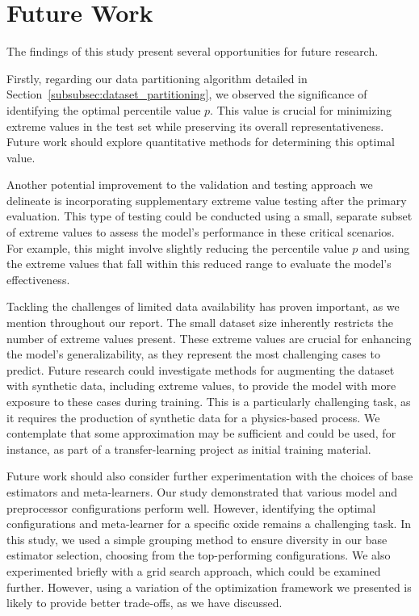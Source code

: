 \section{Future Work}\label{sec:future_work}
The findings of this study present several opportunities for future research.

Firstly, regarding our data partitioning algorithm detailed in Section~\ref{subsubsec:dataset_partitioning}, we observed the significance of identifying the optimal percentile value $p$.
This value is crucial for minimizing extreme values in the test set while preserving its overall representativeness.
Future work should explore quantitative methods for determining this optimal value.

Another potential improvement to the validation and testing approach we delineate is incorporating supplementary extreme value testing after the primary evaluation.
This type of testing could be conducted using a small, separate subset of extreme values to assess the model's performance in these critical scenarios.
For example, this might involve slightly reducing the percentile value $p$ and using the extreme values that fall within this reduced range to evaluate the model's effectiveness.

Tackling the challenges of limited data availability has proven important, as we mention throughout our report.
The small dataset size inherently restricts the number of extreme values present.
These extreme values are crucial for enhancing the model's generalizability, as they represent the most challenging cases to predict.
Future research could investigate methods for augmenting the dataset with synthetic data, including extreme values, to provide the model with more exposure to these cases during training.
This is a particularly challenging task, as it requires the production of synthetic data for a physics-based process.
We contemplate that some approximation may be sufficient and could be used, for instance, as part of a transfer-learning project as initial training material.

Future work should also consider further experimentation with the choices of base estimators and meta-learners.
Our study demonstrated that various model and preprocessor configurations perform well.
However, identifying the optimal configurations and meta-learner for a specific oxide remains a challenging task.
In this study, we used a simple grouping method to ensure diversity in our base estimator selection, choosing from the top-performing configurations.
We also experimented briefly with a grid search approach, which could be examined further.
However, using a variation of the optimization framework we presented is likely to provide better trade-offs, as we have discussed.